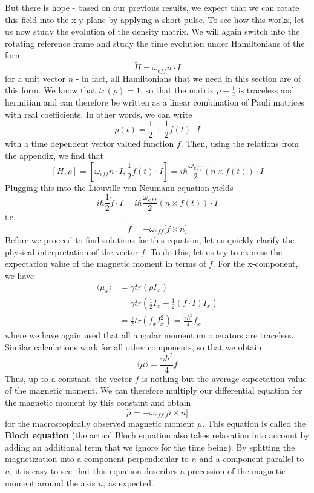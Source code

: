 \documentclass[a4paper, draft]{article}
\theoremstyle{own}
\theoremstyle{remark}
\begin{document}
But there is hope - based on our previous results, we expect that we can rotate this field into the x-y-plane by applying a short pulse. To see how this works, let us now study the evolution of the density matrix. We will again switch into the rotating reference frame and study the time evolution under Hamiltonians of the form
$$
\widetilde{H} =  \omega_{eff} n \cdot I
$$
for a unit vector $n$ - in fact, all Hamiltonians that we need in this section are of this form. We know that $tr(\rho) = 1$, so that the matrix $\rho - \frac{1}{2}$ is traceless and hermitian and can therefore be written as a linear combination of Pauli matrices with real coefficients. In other words, we can write
$$
\rho(t) = \frac{1}{2}  + \frac{1}{2} f(t) \cdot I 
$$
with a time dependent vector valued function $f$. Then, using the relations from the appendix, we find that
$$
[H,\rho] = [ \omega_{eff} n \cdot I, \frac{1}{2} f(t) \cdot I]
=  i \hbar \frac{\omega_{eff}}{2} (n \times f(t)) \cdot I
$$
Plugging this into the Liouville-von Neumann equation yields
$$
i \hbar \frac{1}{2} \dot{f} \cdot I  =  i \hbar \frac{\omega_{eff}}{2} (n \times f(t)) \cdot I
$$
i.e.
$$
\dot{f} =  -\omega_{eff} \big[  f \times n \big] 
$$
Before we proceed to find solutions for this equation, let us quickly clarify the physical interpretation of the vector $f$. To do this, let us try to express the expectation value of the magnetic moment in terms of $f$. For the x-component, we have
\begin{align*}
\langle \mu_x \rangle &= \gamma tr(\rho I_x) \\ 
&= \gamma tr(\frac{1}{2} I_x + \frac{1}{2} (f \cdot I) I_x  ) \\
&= \frac{\gamma}{2} tr(f_x I_x^2) = \frac{\gamma \hbar^2}{4} f_x
\end{align*}
where we have again used that all angular momentum operators are traceless. Similar calculations work for all other components, so that we obtain
$$
\langle \mu \rangle = \frac{\gamma \hbar^2}{4} f
$$
Thus, up to a constant, the vector $f$ is nothing but the average expectation value of the magnetic moment. We can therefore multiply our differential equation for the magnetic moment by this constant and obtain
$$
\dot{\mu} = -\omega_{eff} \big[ \mu \times n \big] 
$$
for the macroscopically observed magnetic moment $\mu$. This equation is called the {\bf Bloch equation} (the actual Bloch equation also takes relaxation into account by adding an additional term that we ignore for the time being). By splitting the magnetization into a component perpendicular to $n$ and a component parallel to $n$, it is easy to see that this equation describes a precession of the magnetic moment around the axis $n$, as expected.
\end{document}
